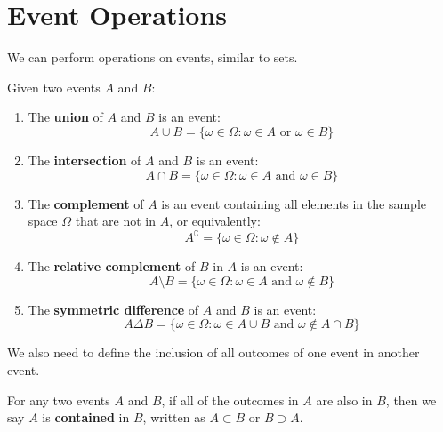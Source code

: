 \documentclass{huhtakm-template-book-v2}
\begin{document}
\section{Event Operations}
    We can perform operations on events, similar to sets.
    \begin{defn}
        Given two events $A$ and $B$:
        \begin{enumerate}
            \item The \textbf{union} of $A$ and $B$ is an event:
            \begin{equation*}
                A\cup B = \{\omega \in \Omega:\omega \in A\text{ or }\omega \in B\}
            \end{equation*}
            \item The \textbf{intersection} of $A$ and $B$ is an event:
            \begin{equation*}
                A\cap B = \{\omega \in \Omega:\omega \in A\text{ and }\omega \in B\}
            \end{equation*}
            \item The \textbf{complement} of $A$ is an event containing all elements in the sample space $\Omega$ that are not in $A$, or equivalently:
            \begin{equation*}
                A^{\complement} = \{\omega \in \Omega:\omega \not \in A\}
            \end{equation*}
            \item The \textbf{relative complement} of $B$ in $A$ is an event:
            \begin{equation*}
                A\setminus B = \{\omega \in \Omega:\omega \in A\text{ and }\omega \not \in B\}
            \end{equation*}
            \item The \textbf{symmetric difference} of $A$ and $B$ is an event:
            \begin{equation*}
                A\Delta B = \{\omega \in \Omega:\omega \in A\cup B\text{ and }\omega \not \in A\cap B\}
            \end{equation*}
        \end{enumerate}
    \end{defn}
    We also need to define the inclusion of all outcomes of one event in another event.
    \begin{defn}
        For any two events $A$ and $B$, if all of the outcomes in $A$ are also in $B$, then we say $A$ is \textbf{contained} in $B$, written as $A\subset B$ or $B\supset A$.
    \end{defn}
\end{document}
